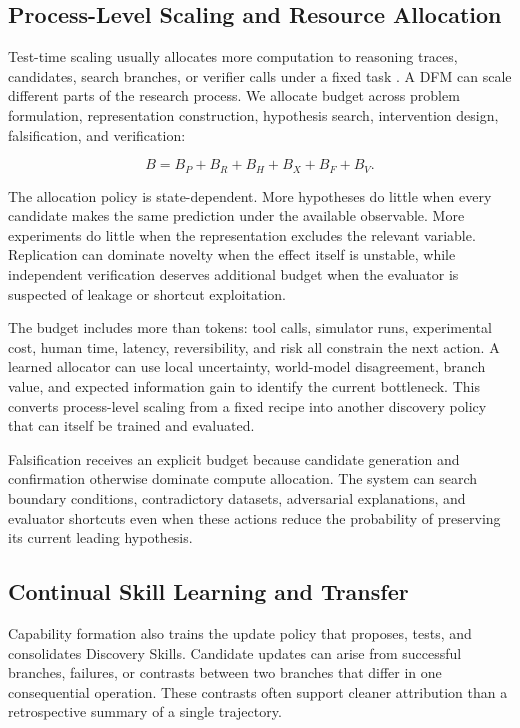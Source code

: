 \documentclass[11pt, a4paper, copyright]{google}
\begin{document}
\subsection{Process-Level Scaling and Resource Allocation}
\label{subsec:discovery-scaling}

Test-time scaling usually allocates more computation to reasoning traces, candidates, search branches, or verifier calls under a fixed task \citep{snell2025testtime}. A DFM can scale different parts of the research process. We allocate budget across problem formulation, representation construction, hypothesis search, intervention design, falsification, and verification:

\begin{equation}
B=B_P+B_R+B_H+B_X+B_F+B_V.
\label{eq:discovery-budget}
\end{equation}

The allocation policy is state-dependent. More hypotheses do little when every candidate makes the same prediction under the available observable. More experiments do little when the representation excludes the relevant variable. Replication can dominate novelty when the effect itself is unstable, while independent verification deserves additional budget when the evaluator is suspected of leakage or shortcut exploitation.

The budget includes more than tokens: tool calls, simulator runs, experimental cost, human time, latency, reversibility, and risk all constrain the next action. A learned allocator can use local uncertainty, world-model disagreement, branch value, and expected information gain to identify the current bottleneck. This converts process-level scaling from a fixed recipe into another discovery policy that can itself be trained and evaluated.

Falsification receives an explicit budget because candidate generation and confirmation otherwise dominate compute allocation. The system can search boundary conditions, contradictory datasets, adversarial explanations, and evaluator shortcuts even when these actions reduce the probability of preserving its current leading hypothesis.

\subsection{Continual Skill Learning and Transfer}
\label{subsec:continual-skill-evolution}

Capability formation also trains the update policy that proposes, tests, and consolidates Discovery Skills. Candidate updates can arise from successful branches, failures, or contrasts between two branches that differ in one consequential operation. These contrasts often support cleaner attribution than a retrospective summary of a single trajectory.
\end{document}
